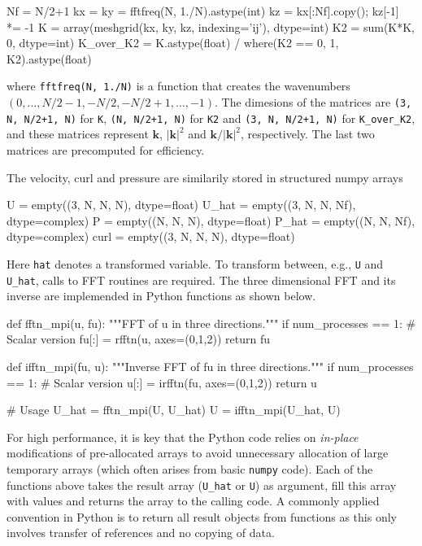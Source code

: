 \documentclass[11pt, oneside]{article}
\newcommand{\inpyth}{\lstinline[style=pythonstyle, basicstyle=\ttfamily]} %[]%
\begin{document}
\begin{python}
Nf = N/2+1
kx = ky = fftfreq(N, 1./N).astype(int)
kz = kx[:Nf].copy(); kz[-1] *= -1
K = array(meshgrid(kx, ky, kz, indexing='ij'), dtype=int)
K2 = sum(K*K, 0, dtype=int)
K_over_K2 = K.astype(float) / where(K2 == 0, 1, K2).astype(float)
\end{python}
where \inpyth{fftfreq(N, 1./N)} is a function that creates the wavenumbers $(0, \ldots, N/2-1, -N/2, -N/2+1, \ldots, -1)$. The dimesions of the matrices are \inpyth{(3, N, N/2+1, N)} for \texttt{K}, \inpyth{(N, N/2+1, N)} for \texttt{K2} and \inpyth{(3, N, N/2+1, N)} for \texttt{K\_over\_K2}, and these matrices represent $\bm{k}$, $|\bm{k}|^2$ and $\bm{k}/|\bm{k}|^2$, respectively. The last two matrices are precomputed for efficiency.

The velocity, curl and pressure are similarily stored in structured numpy arrays

\begin{python}
U     = empty((3, N, N, N),  dtype=float)
U_hat = empty((3, N, N, Nf), dtype=complex)
P     = empty((N, N, N),     dtype=float)
P_hat = empty((N, N, Nf),    dtype=complex)
curl  = empty((3, N, N, N),  dtype=float)
\end{python}
Here \inpyth{hat} denotes a transformed variable. To transform between, e.g., \inpyth{U} and \inpyth{U_hat}, calls to FFT routines are required. The three dimensional FFT and its inverse are implemended in Python functions as shown below.

\begin{python}
def fftn_mpi(u, fu):
    """FFT of u in three directions."""
    if num_processes == 1:                # Scalar version
        fu[:] = rfftn(u, axes=(0,1,2))
    return fu

def ifftn_mpi(fu, u):
    """Inverse FFT of fu in three directions."""
    if num_processes == 1:                # Scalar version
        u[:] = irfftn(fu, axes=(0,1,2))
    return u

# Usage
U_hat = fftn_mpi(U, U_hat)
U = ifftn_mpi(U_hat, U)
\end{python}
For high performance, it is key that the Python code relies on \emph{in-place}
modifications of pre-allocated arrays to avoid unnecessary allocation of
large temporary arrays (which often arises from basic \texttt{numpy} code).
Each of the functions above takes the result array (\texttt{U\_hat} or
\texttt{U}) as argument, fill this array with values and returns the
array to the calling code. A commonly applied convention in
Python is to return all result objects from functions as this only involves
transfer of references and no copying of data.
\end{document}

